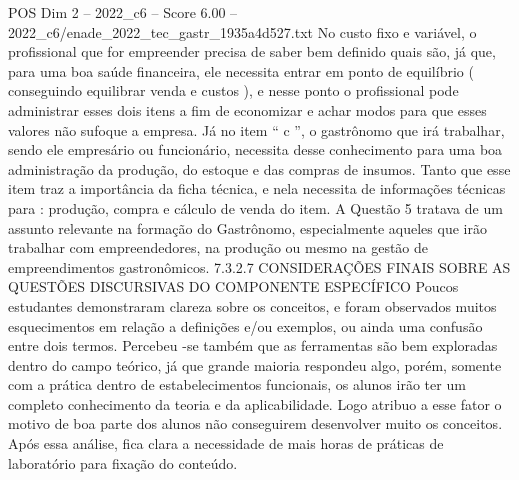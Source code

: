 \begin{textsample}{POS Dim 2 – 2022\_c6 – Score 6.00 – 2022\_c6/enade\_2022\_tec\_gastr\_1935a4d527.txt}
No custo fixo e variável, o profissional que for empreender precisa de saber bem definido quais são, já que, para uma boa saúde financeira, ele necessita entrar em ponto de equilíbrio ( conseguindo equilibrar venda e custos ), e nesse ponto o profissional pode administrar esses dois itens a fim de economizar e achar modos para que esses valores não sufoque a empresa.
Já no item “ c ”, o gastrônomo que irá trabalhar, sendo ele empresário ou funcionário, necessita desse conhecimento para uma boa administração da produção, do estoque e das compras de insumos.
Tanto que esse item traz a importância da ficha técnica, e nela necessita de informações técnicas para : produção, compra e cálculo de venda do item.
A Questão 5 tratava de um assunto relevante na formação do Gastrônomo, especialmente aqueles que irão trabalhar com empreendedores, na produção ou mesmo na gestão de empreendimentos gastronômicos. 7.3.2.7 CONSIDERAÇÕES FINAIS SOBRE AS QUESTÕES DISCURSIVAS DO COMPONENTE ESPECÍFICO Poucos estudantes demonstraram clareza sobre os conceitos, e foram observados muitos esquecimentos em relação a definições e/ou exemplos, ou ainda uma confusão entre dois termos.
Percebeu -se também que as ferramentas são bem exploradas dentro do campo teórico, já que grande maioria respondeu algo, porém, somente com a prática dentro de estabelecimentos funcionais, os alunos irão ter um completo conhecimento da teoria e da aplicabilidade.
Logo atribuo a esse fator o motivo de boa parte dos alunos não conseguirem desenvolver muito os conceitos.
Após essa análise, fica clara a necessidade de mais horas de práticas de laboratório para fixação do conteúdo.

\end{textsample}
